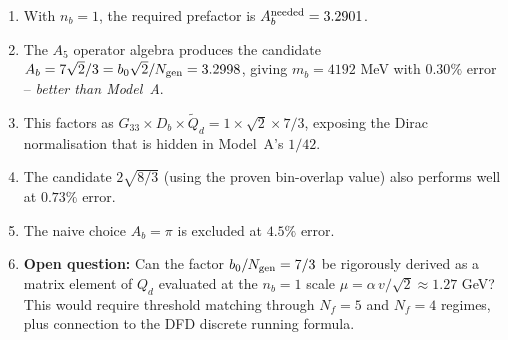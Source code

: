 \documentclass[11pt]{article}
\begin{document}
\begin{enumerate}
\item With $n_b = 1$, the required prefactor is $A_b^{\rm needed} = 3.2901$.
\item The $A_5$ operator algebra produces the candidate
  $A_b = 7\sqrt{2}/3 = b_0\sqrt{2}/N_{\rm gen} = 3.2998$,
  giving $m_b = 4192$ MeV with $0.30\%$ error -- \emph{better than Model~A}.
\item This factors as $G_{33} \times D_b \times \widetilde{Q}_d = 1 \times
  \sqrt{2} \times 7/3$, exposing the Dirac normalisation that is hidden
  in Model~A's $1/42$.
\item The candidate $2\sqrt{8/3}$ (using the proven bin-overlap value)
  also performs well at $0.73\%$ error.
\item The naive choice $A_b = \pi$ is excluded at $4.5\%$ error.
\item \textbf{Open question:} Can the factor $b_0/N_{\rm gen} = 7/3$ be
  rigorously derived as a matrix element of $Q_d$ evaluated at the
  $n_b = 1$ scale $\mu = \alpha\,v/\sqrt{2} \approx 1.27$ GeV?
  This would require threshold matching through $N_f = 5$ and $N_f = 4$
  regimes, plus connection to the DFD discrete running formula.
\end{enumerate}
\end{document}
